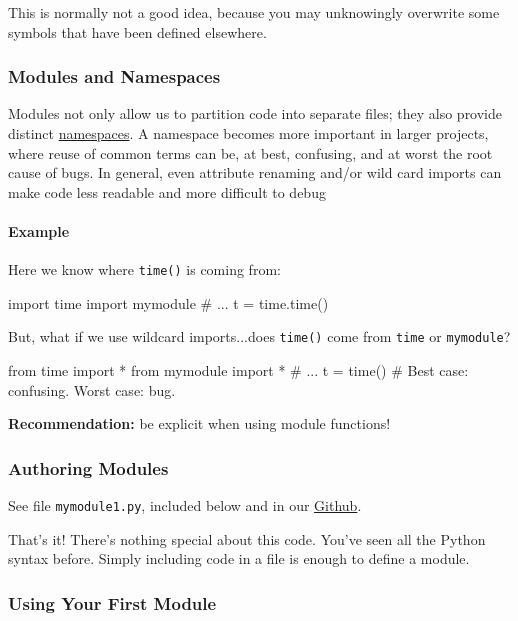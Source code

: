 \documentclass[12pt,letterpaper,twoside]{article}
\begin{document}
\begin{enumerate}
This is normally not a good idea, because you may unknowingly overwrite
some symbols that have been defined elsewhere.

\subsubsection{Modules and Namespaces}
Modules not only allow us to partition code into separate files; they also provide
distinct \href{https://en.wikipedia.org/wiki/Namespace}{namespaces}. A namespace
becomes more important in larger projects, where reuse of common terms can be, at best,
confusing, and at worst the root cause of bugs.
In general, even attribute renaming and/or wild card imports can make code less
readable and more difficult to debug

\paragraph{Example}
Here we know where \texttt{time()} is coming from:

\begin{python}
import time
import mymodule
# ...
t = time.time()
\end{python}

But, what if we use wildcard imports...does \texttt{time()} come from \texttt{time} or \texttt{mymodule}?

\begin{python}
from time import *
from mymodule import *
# ...
t = time()   # Best case: confusing. Worst case: bug.
\end{python}

\textbf{Recommendation:} be explicit when using module functions!

\subsubsection{Authoring Modules}

See file \texttt{mymodule1.py}, included below and in our 
\href{https://github.com/CME211/notes/blob/fall_18/lecture-05/mymodule1.py}{Github}.



That's it! There's nothing special about this code. You've seen all the Python syntax before.
Simply including code in a file is enough to define a module.

\subsubsection{Using Your First Module}


\end{enumerate}
\end{document}
